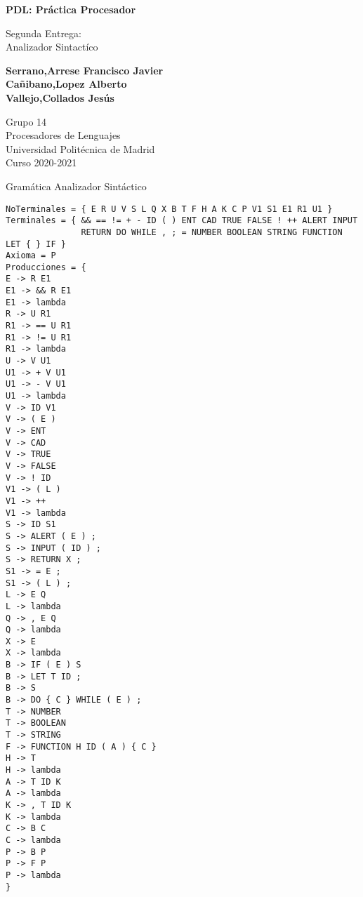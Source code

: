 \documentclass{article}
\begin{document}
\begin{titlepage}
    \begin{center}
        \vspace*{1cm}

        \Huge
        \textbf{PDL: Práctica Procesador}
        
        \vspace{0.5cm}
        \large
        Segunda Entrega: \\
        Analizador Sintactíco
        \vspace{3cm}
       
        \textbf{
            Serrano,Arrese Francisco Javier\\
            Cañibano,Lopez Alberto\\
            Vallejo,Collados Jesús
            }
            
        \vspace{8cm}
    
        \large
        Grupo 14 \\
        Procesadores de Lenguajes\\
        Universidad Politécnica de Madrid\\
        Curso 2020-2021
        
    \end{center}
\end{titlepage}
\newpage
Gramática Analizador Sintáctico
\begin{verbatim}
NoTerminales = { E R U V S L Q X B T F H A K C P V1 S1 E1 R1 U1 }
Terminales = { && == != + - ID ( ) ENT CAD TRUE FALSE ! ++ ALERT INPUT 
               RETURN DO WHILE , ; = NUMBER BOOLEAN STRING FUNCTION LET { } IF }
Axioma = P
Producciones = {
E -> R E1
E1 -> && R E1
E1 -> lambda
R -> U R1
R1 -> == U R1
R1 -> != U R1
R1 -> lambda
U -> V U1
U1 -> + V U1
U1 -> - V U1
U1 -> lambda
V -> ID V1
V -> ( E ) 
V -> ENT 
V -> CAD 
V -> TRUE 
V -> FALSE 
V -> ! ID
V1 -> ( L )
V1 -> ++
V1 -> lambda
S -> ID S1
S -> ALERT ( E ) ;
S -> INPUT ( ID ) ;
S -> RETURN X ;
S1 -> = E ;
S1 -> ( L ) ;
L -> E Q 
L -> lambda
Q -> , E Q 
Q -> lambda
X -> E 
X -> lambda
B -> IF ( E ) S 
B -> LET T ID ;
B -> S
B -> DO { C } WHILE ( E ) ;
T -> NUMBER 
T -> BOOLEAN 
T -> STRING
F -> FUNCTION H ID ( A ) { C }
H -> T 
H -> lambda
A -> T ID K 
A -> lambda
K -> , T ID K 
K -> lambda
C -> B C 
C -> lambda
P -> B P 
P -> F P
P -> lambda
}
\end{verbatim}
\end{document}
